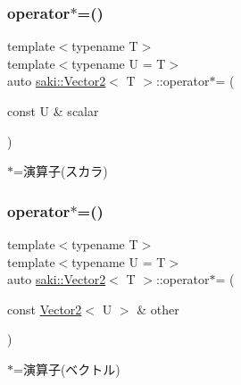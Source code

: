 \subsubsection{\texorpdfstring{operator$\ast$=()}{operator*=()}\hspace{0.1cm}{\footnotesize\ttfamily [1/2]}}
{\footnotesize\ttfamily template$<$typename T$>$ \\
template$<$typename U  = T$>$ \\
auto \mbox{\hyperlink{classsaki_1_1_vector2}{saki\+::\+Vector2}}$<$ T $>$\+::operator$\ast$= (\begin{DoxyParamCaption}\item[{const U \&}]{scalar }\end{DoxyParamCaption})\hspace{0.3cm}{\ttfamily [inline]}}



$\ast$=演算子(スカラ) 

\mbox{\label{classsaki_1_1_vector2_a31e1e9e5918b362e2559b453da787fbb}} 
\subsubsection{\texorpdfstring{operator$\ast$=()}{operator*=()}\hspace{0.1cm}{\footnotesize\ttfamily [2/2]}}
{\footnotesize\ttfamily template$<$typename T$>$ \\
template$<$typename U  = T$>$ \\
auto \mbox{\hyperlink{classsaki_1_1_vector2}{saki\+::\+Vector2}}$<$ T $>$\+::operator$\ast$= (\begin{DoxyParamCaption}\item[{const \mbox{\hyperlink{classsaki_1_1_vector2}{Vector2}}$<$ U $>$ \&}]{other }\end{DoxyParamCaption})\hspace{0.3cm}{\ttfamily [inline]}}



$\ast$=演算子(ベクトル) 

\mbox{\label{classsaki_1_1_vector2_aafa91902a943dd0deb78bbcebb14f3dd}} 
